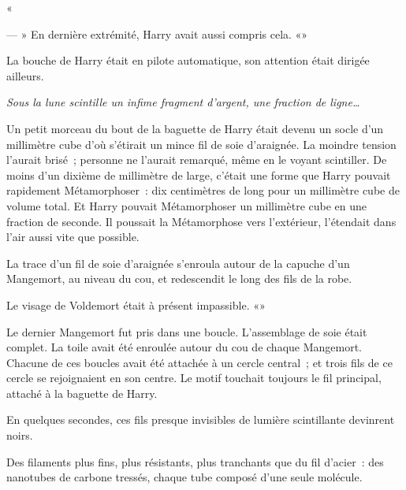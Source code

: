 «

--- » En dernière extrémité, Harry avait aussi compris cela. «»

La bouche de Harry était en pilote automatique, son attention était dirigée ailleurs.

\emph{Sous la lune scintille un infime fragment d'argent, une fraction de ligne…}

Un petit morceau du bout de la baguette de Harry était devenu un socle d'un millimètre cube d'où s'étirait un mince fil de soie d'araignée. La moindre tension l'aurait brisé~; personne ne l'aurait remarqué, même en le voyant scintiller. De moins d'un dixième de millimètre de large, c'était une forme que Harry pouvait rapidement Métamorphoser~: dix centimètres de long pour un millimètre cube de volume total. Et Harry pouvait Métamorphoser un millimètre cube en une fraction de seconde. Il poussait la Métamorphose vers l'extérieur, l'étendait dans l'air aussi vite que possible.

La trace d'un fil de soie d'araignée s'enroula autour de la capuche d'un Mangemort, au niveau du cou, et redescendit le long des fils de la robe.

Le visage de Voldemort était à présent impassible. «»

Le dernier Mangemort fut pris dans une boucle. L'assemblage de soie était complet. La toile avait été enroulée autour du cou de chaque Mangemort. Chacune de ces boucles avait été attachée à un cercle central~; et trois fils de ce cercle se rejoignaient en son centre. Le motif touchait toujours le fil principal, attaché à la baguette de Harry.

En quelques secondes, ces fils presque invisibles de lumière scintillante devinrent noirs.

Des filaments plus fins, plus résistants, plus tranchants que du fil d'acier~: des nanotubes de carbone tressés, chaque tube composé d'une seule molécule.

